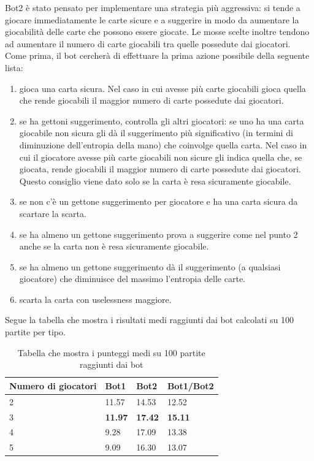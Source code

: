 \documentclass{article}
\begin{document}
\begin{flushleft}
Bot2 è stato pensato per implementare una strategia più aggressiva: si tende a giocare immediatamente le carte sicure e a suggerire in modo da aumentare la giocabilità delle carte che possono essere giocate. Le mosse scelte inoltre tendono ad aumentare il numero di carte giocabili tra quelle possedute dai giocatori. Come prima, il bot cercherà di effettuare la prima azione possibile della seguente lista:
\begin{enumerate}
    \item  gioca una carta sicura. Nel caso in cui avesse più carte giocabili gioca quella che rende giocabili il maggior numero di carte possedute dai giocatori.
    \item se ha gettoni suggerimento, controlla gli altri giocatori: se uno ha una carta giocabile non sicura gli dà il suggerimento più significativo (in termini di diminuzione dell'entropia della mano) che coinvolge quella carta. Nel caso in cui il giocatore avesse più carte giocabili non sicure gli indica quella che, se giocata, rende giocabili il maggior numero di carte possedute dai giocatori.
    Questo consiglio viene dato solo se la carta è resa sicuramente giocabile.
    \item se non c'è un gettone suggerimento per giocatore e ha una carta sicura da scartare la scarta.
	\item se ha almeno un gettone suggerimento prova a suggerire come nel punto 2 anche se la carta non è resa sicuramente giocabile.
	\item se ha almeno un gettone suggerimento dà il suggerimento (a qualsiasi giocatore) che diminuisce del massimo l'entropia delle carte.
    \item scarta la carta con uselessness maggiore.
\end{enumerate}
Segue la tabella che mostra i risultati medi raggiunti dai bot calcolati su 100 partite per tipo.
\end{flushleft}
\begin{table}[h]
    \centering
    \begin{tabular}{m|b|b|b}
        \toprule
        \textbf{Numero di giocatori} & \textbf{Bot1} & \textbf{Bot2} & \textbf{Bot1/Bot2} \\
        \midrule
        2 & 11.57 & 14.53 & 12.52 \\
        3 & \textbf{11.97} & \textbf{17.42} & \textbf{15.11} \\
        4 & 9.28 & 17.09 & 13.38\\
        5 & 9.09 & 16.30 & 13.07 \\
    \end{tabular}
    \caption{Tabella che mostra i punteggi medi su 100 partite raggiunti dai bot}
\end{table}
\end{document}

